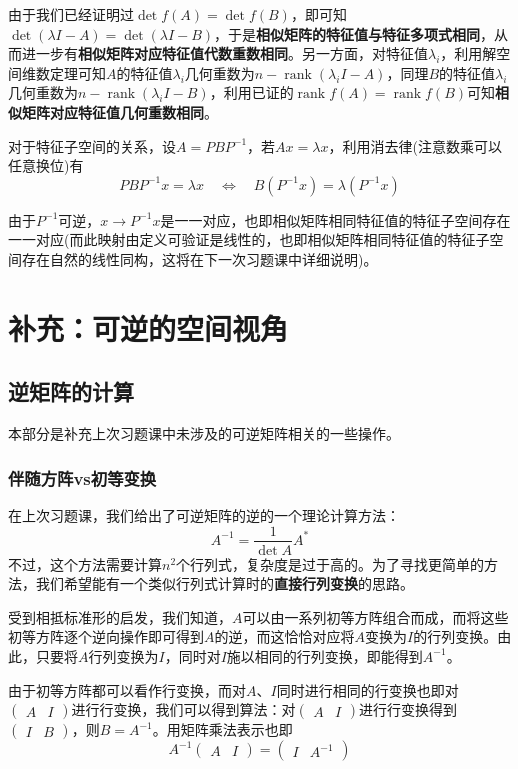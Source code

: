 \documentclass[a4paper,UTF8,fontset=windows]{ctexart}
\DeclareMathOperator{\rank}{rank}
\begin{document}
由于我们已经证明过$\det f(A)=\det f(B)$，即可知$\det(\lambda I-A)=\det(\lambda I-B)$，于是\textbf{相似矩阵的特征值与特征多项式相同}，从而进一步有\textbf{相似矩阵对应特征值代数重数相同}。另一方面，对特征值$\lambda_i$，利用解空间维数定理可知$A$的特征值$\lambda_i$几何重数为$n-\rank(\lambda_iI-A)$，同理$B$的特征值$\lambda_i$几何重数为$n-\rank(\lambda_iI-B)$，利用已证的$\rank f(A)=\rank f(B)$可知\textbf{相似矩阵对应特征值几何重数相同}。

对于特征子空间的关系，设$A=PBP^{-1}$，若$Ax=\lambda x$，利用消去律(注意数乘可以任意换位)有
$$PBP^{-1}x=\lambda x\quad\Longleftrightarrow\quad B(P^{-1}x)=\lambda(P^{-1}x)$$

由于$P^{-1}$可逆，$x\to P^{-1}x$是一一对应，也即相似矩阵相同特征值的特征子空间存在一一对应(而此映射由定义可验证是线性的，也即相似矩阵相同特征值的特征子空间存在自然的线性同构，这将在下一次习题课中详细说明)。

\section{补充：可逆的空间视角}
\subsection{逆矩阵的计算}
本部分是补充上次习题课中未涉及的可逆矩阵相关的一些操作。

\subsubsection{伴随方阵vs初等变换}
在上次习题课，我们给出了可逆矩阵的逆的一个理论计算方法：
$$A^{-1}=\frac{1}{\det A}A^*$$
不过，这个方法需要计算$n^2$个行列式，复杂度是过于高的。为了寻找更简单的方法，我们希望能有一个类似行列式计算时的\textbf{直接行列变换}的思路。

受到相抵标准形的启发，我们知道，$A$可以由一系列初等方阵组合而成，而将这些初等方阵逐个逆向操作即可得到$A$的逆，而这恰恰对应将$A$变换为$I$的行列变换。由此，只要将$A$行列变换为$I$，同时对$I$施以相同的行列变换，即能得到$A^{-1}$。

由于初等方阵都可以看作行变换，而对$A$、$I$同时进行相同的行变换也即对$\begin{pmatrix}A&I\end{pmatrix}$进行行变换，我们可以得到算法：对$\begin{pmatrix}A&I\end{pmatrix}$进行行变换得到$\begin{pmatrix}I&B\end{pmatrix}$，则$B=A^{-1}$。用矩阵乘法表示也即
$$A^{-1}\begin{pmatrix}A&I\end{pmatrix}=\begin{pmatrix}I&A^{-1}\end{pmatrix}$$
\end{document}
